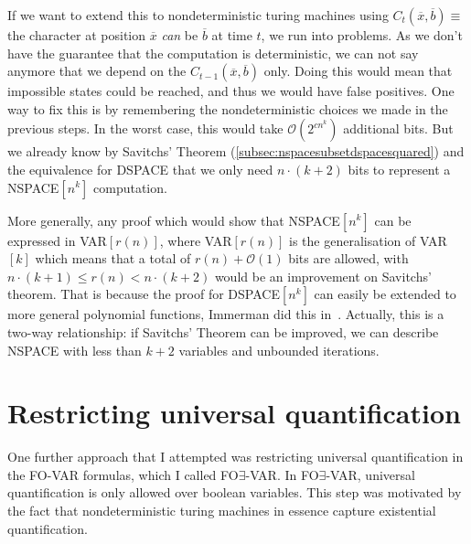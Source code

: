 If we want to extend this to nondeterministic turing machines using $C_{t}(\overline{x}, \overline{b}) \equiv $ the character at position $\overline{x}$ \emph{can} be $\overline{b}$ at time $t$, we run into problems.
As we don't have the guarantee that the computation is deterministic, we can not say anymore that we depend on the $C_{t - 1}(\overline{x}, \overline{b})$ only.
Doing this would mean that impossible states could be reached, and thus we would have false positives.
One way to fix this is by remembering the nondeterministic choices we made in the previous steps.
In the worst case, this would take $\mathcal{O}(2^{cn^k})$ additional bits.
But we already know by Savitchs' Theorem (\cref{subsec:nspacesubsetdspacesquared}) and the equivalence for DSPACE that we only need $n \cdot (k + 2)$ bits to represent a NSPACE$[n^k]$ computation.

More generally, any proof which would show that NSPACE$[n^k]$ can be expressed in VAR$[r(n)]$, where VAR$[r(n)]$ is the generalisation of VAR$[k]$ which means that a total of $r(n) + \mathcal{O}(1)$ bits are allowed, with $n \cdot (k + 1) \leq r(n) < n \cdot (k + 2)$ would be an improvement on Savitchs' theorem.
That is because the proof for DSPACE$[n^k]$ can easily be extended to more general polynomial functions, Immerman did this in~\cite{Immerman1999}.
Actually, this is a two-way relationship: if Savitchs' Theorem can be improved, we can describe NSPACE with less than $k + 2$ variables and unbounded iterations.

\section{Restricting universal quantification}\label{sec:restricting-universal-quantification}

One further approach that I attempted was restricting universal quantification in the FO-VAR formulas, which I called FO$\exists$-VAR\@.
In FO$\exists$-VAR, universal quantification is only allowed over boolean variables.
This step was motivated by the fact that nondeterministic turing machines in essence capture existential quantification.

